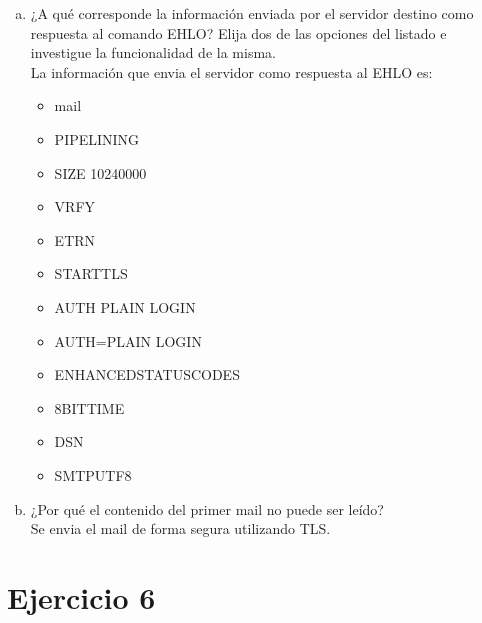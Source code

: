 \documentclass[osajnl,twocolumn,showpacs,superscriptaddress,10pt]{revtex4-1} %
\begin{document}
\begin{enumerate}[a)]
  \item ¿A qué corresponde la información enviada por el servidor destino como respuesta al comando EHLO? Elija dos de las opciones del listado e investigue la funcionalidad de la misma. \\

  La información que envia el servidor como respuesta al EHLO es:

  \begin{itemize}
    \item mail
    \item PIPELINING
    \item SIZE 10240000
    \item VRFY
    \item ETRN
    \item STARTTLS
    \item AUTH PLAIN LOGIN
    \item AUTH=PLAIN LOGIN
    \item ENHANCEDSTATUSCODES
    \item 8BITTIME
    \item DSN
    \item SMTPUTF8
  \end{itemize}
  
  \item ¿Por qué el contenido del primer mail no puede ser leído? \\
  
  Se envia el mail de forma segura utilizando TLS.
\end{enumerate}

\section{Ejercicio 6}
\end{document}
